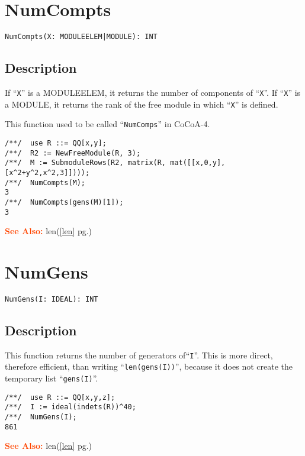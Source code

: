 \documentclass[a4paper]{mybook}
\newenvironment{command}{}{} %
\newcommand\SeeAlso{\par\textcolor{OrangeRed}{\textbf{\large See Also: }}}
\begin{document}
\section{NumCompts}
\label{NumCompts}
\begin{command} %


\begin{Verbatim}[label=syntax, rulecolor=\color{MidnightBlue},
frame=single]
NumCompts(X: MODULEELEM|MODULE): INT
\end{Verbatim}


\subsection*{Description}

If ``\verb&X&'' is a MODULEELEM, it returns the number of components of ``\verb&X&''.
If ``\verb&X&'' is a MODULE, it returns the rank of the free module in which ``\verb&X&'' is
defined.
\par 
This function used to be called ``\verb&NumComps&'' in CoCoA-4.
\begin{Verbatim}[label=example, rulecolor=\color{PineGreen}, frame=single]
/**/  use R ::= QQ[x,y];
/**/  R2 := NewFreeModule(R, 3);
/**/  M := SubmoduleRows(R2, matrix(R, mat([[x,0,y], [x^2+y^2,x^2,3]])));
/**/  NumCompts(M);
3
/**/  NumCompts(gens(M)[1]);
3
\end{Verbatim}


\SeeAlso %
  len(\ref{len} pg.\pageref{len})
\end{command} %

\section{NumGens}
\label{NumGens}
\begin{command} %


\begin{Verbatim}[label=syntax, rulecolor=\color{MidnightBlue},
frame=single]
NumGens(I: IDEAL): INT
\end{Verbatim}


\subsection*{Description}

This function returns the number of generators of``\verb&I&''.
This is more direct, therefore efficient, than writing ``\verb&len(gens(I))&'',
because it does not create the temporary list ``\verb&gens(I)&''.
\begin{Verbatim}[label=example, rulecolor=\color{PineGreen}, frame=single]
/**/  use R ::= QQ[x,y,z];
/**/  I := ideal(indets(R))^40;
/**/  NumGens(I);
861
\end{Verbatim}


\SeeAlso %
  len(\ref{len} pg.\pageref{len})
\end{command} %
\end{document}
